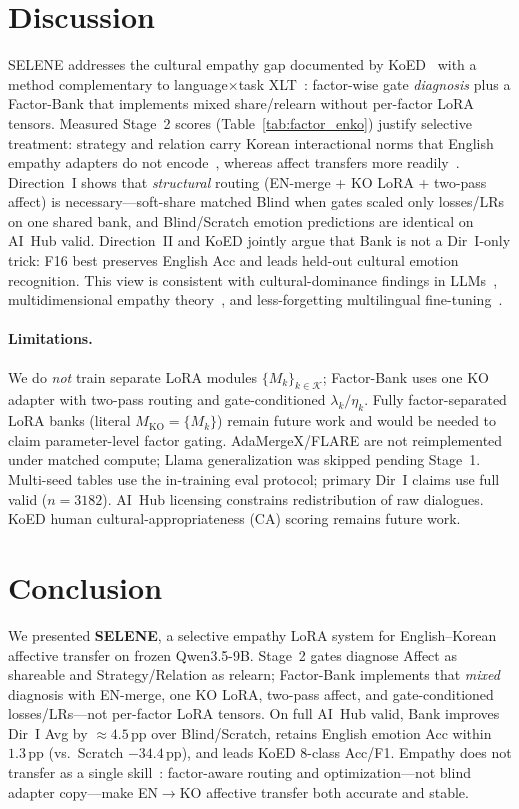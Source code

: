 \documentclass[journal]{IEEEtran}
\begin{document}
\section{Discussion}
SELENE addresses the cultural empathy gap documented by KoED~\cite{lee2025koed} with a method complementary to language$\times$task XLT~\cite{pfeiffer2020madx,zhao2025adamerge,borchert2025flare}: factor-wise gate \emph{diagnosis} plus a Factor-Bank that implements mixed share/relearn without per-factor LoRA tensors.
Measured Stage~2 scores (Table~\ref{tab:factor_enko}) justify selective treatment: strategy and relation carry Korean interactional norms that English empathy adapters do not encode~\cite{matsumoto2008culture,lee2025koed}, whereas affect transfers more readily~\cite{davis1983empathy,rashkin2019empathetic}.
Direction~I shows that \emph{structural} routing (EN-merge + KO LoRA + two-pass affect) is necessary---soft-share matched Blind when gates scaled only losses/LRs on one shared bank, and Blind/Scratch emotion predictions are identical on AI~Hub valid.
Direction~II and KoED jointly argue that Bank is not a Dir~I-only trick: F16 best preserves English Acc and leads held-out cultural emotion recognition.
This view is consistent with cultural-dominance findings in LLMs~\cite{zhou2024culture}, multidimensional empathy theory~\cite{davis1983empathy,sharma2020empathy}, and less-forgetting multilingual fine-tuning~\cite{wang2022lfmlf,kirkpatrick2017overcoming}.

\paragraph{Limitations.}
We do \emph{not} train separate LoRA modules $\{M_k\}_{k\in\mathcal{K}}$; Factor-Bank uses one KO adapter with two-pass routing and gate-conditioned $\lambda_k/\eta_k$.
Fully factor-separated LoRA banks (literal $M_{\mathrm{KO}}{=}\{M_k\}$) remain future work and would be needed to claim parameter-level factor gating.
AdaMergeX/FLARE are not reimplemented under matched compute; Llama generalization was skipped pending Stage~1.
Multi-seed tables use the in-training eval protocol; primary Dir~I claims use full valid ($n{=}3182$).
AI~Hub licensing constrains redistribution of raw dialogues.
KoED human cultural-appropriateness (CA) scoring remains future work.

\section{Conclusion}
We presented \textbf{SELENE}, a selective empathy LoRA system for English--Korean affective transfer on frozen Qwen3.5-9B.
Stage~2 gates diagnose Affect as shareable and Strategy/Relation as relearn; Factor-Bank implements that \emph{mixed} diagnosis with EN-merge, one KO LoRA, two-pass affect, and gate-conditioned losses/LRs---not per-factor LoRA tensors.
On full AI~Hub valid, Bank improves Dir~I Avg by ${\approx}4.5$\,pp over Blind/Scratch, retains English emotion Acc within $1.3$\,pp (vs.\ Scratch $-34.4$\,pp), and leads KoED 8-class Acc/F1.
Empathy does not transfer as a single skill~\cite{davis1983empathy,liu2021esc,lee2025koed}: factor-aware routing and optimization---not blind adapter copy---make EN$\rightarrow$KO affective transfer both accurate and stable.
\end{document}
